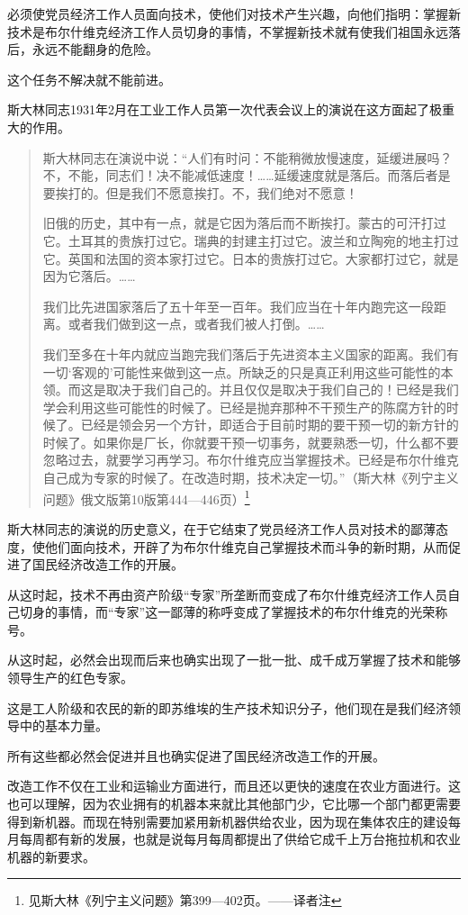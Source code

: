 必须使党员经济工作人员面向技术，使他们对技术产生兴趣，向他们指明：掌握新技术是布尔什维克经济工作人员切身的事情，不掌握新技术就有使我们祖国永远落后，永远不能翻身的危险。

这个任务不解决就不能前进。

斯大林同志1931年2月在工业工作人员第一次代表会议上的演说在这方面起了极重大的作用。

\begin{quotation}
斯大林同志在演说中说：“人们有时问：不能稍微放慢速度，延缓进展吗？不，不能，同志们！决不能减低速度！……延缓速度就是落后。而落后者是要挨打的。但是我们不愿意挨打。不，我们绝对不愿意！

旧俄的历史，其中有一点，就是它因为落后而不断挨打。蒙古的可汗打过它。土耳其的贵族打过它。瑞典的封建主打过它。波兰和立陶宛的地主打过它。英国和法国的资本家打过它。日本的贵族打过它。大家都打过它，就是因为它落后。……

我们比先进国家落后了五十年至一百年。我们应当在十年内跑完这一段距离。或者我们做到这一点，或者我们被人打倒。……

我们至多在十年内就应当跑完我们落后于先进资本主义国家的距离。我们有一切‘客观的’可能性来做到这一点。所缺乏的只是真正利用这些可能性的本领。而这是取决于我们自己的。并且仅仅是取决于我们自己的！已经是我们学会利用这些可能性的时候了。已经是抛弃那种不干预生产的陈腐方针的时候了。已经是领会另一个方针，即适合于目前时期的要干预一切的新方针的时候了。如果你是厂长，你就要干预一切事务，就要熟悉一切，什么都不要忽略过去，就要学习再学习。布尔什维克应当掌握技术。已经是布尔什维克自己成为专家的时候了。在改造时期，技术决定一切。”（斯大林《列宁主义问题》俄文版第10版第444—446页）\footnote{见斯大林《列宁主义问题》第399—402页。——译者注}
\end{quotation}

斯大林同志的演说的历史意义，在于它结束了党员经济工作人员对技术的鄙薄态度，使他们面向技术，开辟了为布尔什维克自己掌握技术而斗争的新时期，从而促进了国民经济改造工作的开展。

从这时起，技术不再由资产阶级“专家”所垄断而变成了布尔什维克经济工作人员自己切身的事情，而“专家”这一鄙薄的称呼变成了掌握技术的布尔什维克的光荣称号。

从这时起，必然会出现而后来也确实出现了一批一批、成千成万掌握了技术和能够领导生产的红色专家。

这是工人阶级和农民的新的即苏维埃的生产技术知识分子，他们现在是我们经济领导中的基本力量。

所有这些都必然会促进并且也确实促进了国民经济改造工作的开展。

改造工作不仅在工业和运输业方面进行，而且还以更快的速度在农业方面进行。这也可以理解，因为农业拥有的机器本来就比其他部门少，它比哪一个部门都更需要得到新机器。而现在特别需要加紧用新机器供给农业，因为现在集体农庄的建设每月每周都有新的发展，也就是说每月每周都提出了供给它成千上万台拖拉机和农业机器的新要求。

